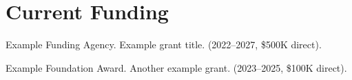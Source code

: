 \section{\sc Current Funding}

Example Funding Agency. Example grant title. (2022--2027, \$500K direct).

Example Foundation Award. Another example grant. (2023--2025, \$100K direct).
